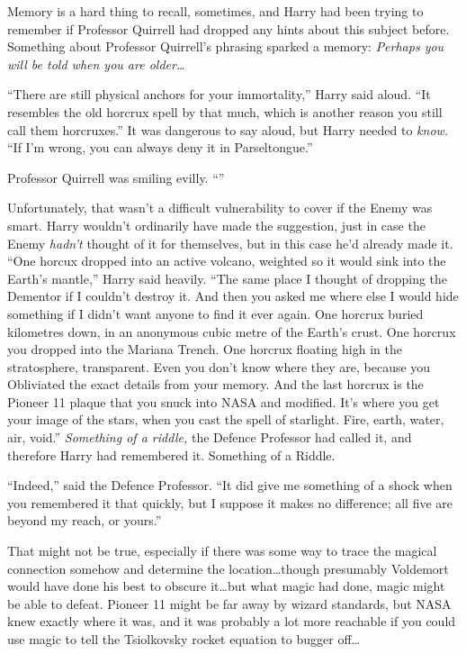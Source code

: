 Memory is a hard thing to recall, sometimes, and Harry had been trying to
remember if Professor Quirrell had dropped any hints about this subject before.
Something about Professor Quirrell’s phrasing sparked a memory: \emph{Perhaps
you will be told when you are older…}

“There are still physical anchors for your immortality,” Harry said aloud. “It
resembles the old horcrux spell by that much, which is another reason you still
call them horcruxes.” It was dangerous to say aloud, but Harry needed to
\emph{know.} “If I’m wrong, you can always deny it in Parseltongue.”

Professor Quirrell was smiling evilly. “”

Unfortunately, that wasn’t a difficult vulnerability to cover if the Enemy was
smart. Harry wouldn’t ordinarily have made the suggestion, just in case the
Enemy \emph{hadn’t} thought of it for themselves, but in this case he’d already
made it. “One horcux dropped into an active volcano, weighted so it would sink
into the Earth’s mantle,” Harry said heavily. “The same place I thought of
dropping the Dementor if I couldn’t destroy it. And then you asked me where
else I would hide something if I didn’t want anyone to find it ever again. One
horcrux buried kilometres down, in an anonymous cubic metre of the Earth’s
crust. One horcrux you dropped into the Mariana Trench. One horcrux floating
high in the stratosphere, transparent. Even you don’t know where they are,
because you Obliviated the exact details from your memory. And the last horcrux
is the Pioneer 11 plaque that you snuck into NASA and modified. It’s where you
get your image of the stars, when you cast the spell of starlight. Fire, earth,
water, air, void.” \emph{Something of a riddle,} the Defence Professor had
called it, and therefore Harry had remembered it. Something of a Riddle.

“Indeed,” said the Defence Professor. “It did give me something of a shock when
you remembered it that quickly, but I suppose it makes no difference; all five
are beyond my reach, or yours.”

That might not be true, especially if there was some way to trace the magical
connection somehow and determine the location…though presumably
Voldemort would have done his best to obscure it…but what magic had
done, magic might be able to defeat. Pioneer 11 might be far away by wizard
standards, but NASA knew exactly where it was, and it was probably a lot more
reachable if you could use magic to tell the Tsiolkovsky rocket equation to
bugger off…

